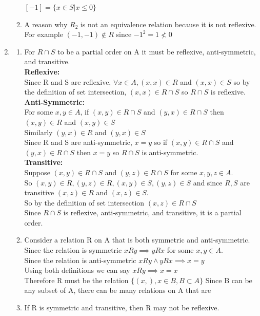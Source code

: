 \documentclass[11pt]{article}
\begin{document}
\begin{enumerate}[]
\begin{enumerate}[label=\alph*]
	$[-1] = \{x\in S | x \leq 0\}$\\
	\item A reason why $R_2$ is not an equivalence relation because it is not reflexive. For example $(-1,-1) \not\in R$ since $-1^2 = 1  \not < 0$ 
	\end{enumerate}
\item
	\begin{enumerate}[label=\alph*]
	\item For $R \cap S$ to be a partial order on A it must be reflexive, anti-symmetric, and transitive.\\
	\textbf{Reflexive:}\\
	Since R and S are reflexive, $\forall x\in A, (x,x)\in R$ and $(x,x)\in S$ so by the definition of set intersection, $(x,x)\in R\cap S$ so $R\cap S$ is reflexive.\\
	\textbf{Anti-Symmetric:}\\
	For some $x,y\in A$, if $(x,y)\in R\cap S$ and $(y,x)\in R\cap S$ then $(x,y)\in R$ and $(x,y)\in S$\\
	Similarly $(y,x)\in R$ and $(y,x)\in S$\\
	Since R and S are anti-symmetric, $x=y$ so if $(x,y)\in R\cap S$ and $(y,x)\in R\cap S$ then $x=y$ so $R\cap S$ is anti-symmetric.\\
	\textbf{Transitive:}\\
	Suppose $(x,y)\in R\cap S$ and $(y,z)\in R\cap S$ for some $x,y,z\in A$.\\
	So $(x,y)\in R, (y,z)\in R, (x,y)\in S, (y,z)\in S$ and since $R,S$ are transitive $(x,z)\in R$ and $(x,z)\in S$.\\
	So by the definition of set intersection $(x,z)\in R\cap S$\\
	Since $R\cap S$ is 	reflexive, anti-symmetric, and transitive, it is a partial order.
	\item
	Consider a relation R on A that is both symmetric and anti-symmetric.\\
	Since the relation is symmetric $xRy \implies yRx$ for some $x,y\in A$.\\
	Since the relation is anti-symmetric $xRy \land yRx \implies x=y$\\
	Using both definitions we can say $xRy\implies x=x$\\
	Therefore R must be the relation $\{(x,), x \in B, B\subset A\}$
	Since B can be any subset of A, there can be many relations on A that are 
	\item
	If R is symmetric and transitive, then R may not be reflexive.\\

\end{enumerate}
\end{enumerate}
\end{document}

